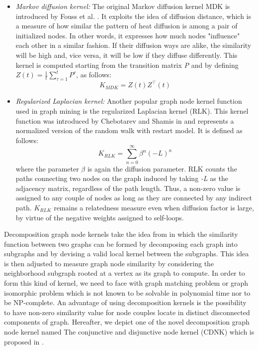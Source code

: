 \documentclass[runningheads,a4paper]{llncs}
\begin{document}
\begin{itemize}
\item \textit{Markov diffusion kernel:} The original Markov diffusion kernel MDK is introduced by Fouss et al. \cite{jour3}. It exploits the idea of diffusion distance, which is a measure of how similar the pattern of heat diffusion is among a pair of initialized nodes. In other words, it expresses how much nodes "influence" each other in a similar fashion. If their diffusion ways are alike, the similarity will be high and, vice versa, it will be low if they diffuse differently. This kernel is computed starting from the transition matrix \textit{P} and by defining $Z(t) = \frac{1}{t}\sum_{\tau=1}^{t} P^{\tau}$, as follows:
\begin{equation}
K_{MDK} = Z(t) Z^{\top}(t)
\end{equation}

\item \textit{Regularized Laplacian kernel:} Another popular graph node kernel function used in graph mining is the regularized Laplacian kernel (RLK). This kernel function was introduced by Chebotarev and Shamis in \cite{rlk} and represents a normalized version of the random walk with restart model. It is defined as follows:
\begin{equation}
K_{RLK} = \sum_{n=0}^{\infty}\beta^{n}(-L)^n
\end{equation}
where the parameter $\beta$ is again the diffusion parameter. RLK counts the paths connecting two nodes on the graph induced by taking \textit{-L} as the adjacency matrix, regardless of the path length. Thus, a non-zero value is assigned to any couple of nodes as long as they are connected by any indirect path. $K_{RLK}$ remains a relatedness measure even when diffusion factor is large, by virtue of the negative weights assigned to self-loops.
\end{itemize}
Decomposition graph node kernels take the idea from \cite{?} in which the similarity function between two graphs can be formed by decomposing each graph into subgraphs and by devising a valid local kernel between the subgraphs. This idea is then adjusted to measure graph node similarity by considering the neighborhood subgraph rooted at a vertex as its graph to compute. In order to form this kind of kernel, we need to face with graph matching problem or graph isomorphic problem which is not known to be solvable in polynomial time nor to be NP-complete. An advantage of using decomposition kernels is the possibility to have non-zero similarity value for node couples locate in distinct disconnected components of graph. Hereafter, we depict one of the novel decomposition graph node kernel named The conjunctive and disjunctive node kernel (CDNK) which is proposed in \cite{?}.
\end{document}

